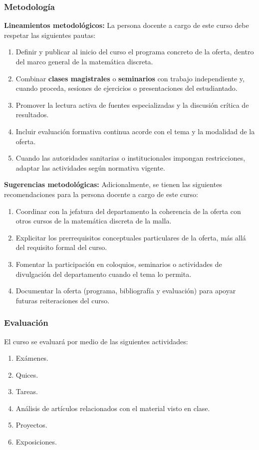 \begin{refsection}
\subsubsection*{Metodología}

\noindent \textbf{Lineamientos metodológicos:} La persona docente a cargo de este curso debe respetar las siguientes pautas:

\begin{enumerate}
    \item Definir y publicar al inicio del curso el programa concreto de la oferta, dentro del marco general de la matemática discreta.
    \item Combinar \textbf{clases magistrales} o \textbf{seminarios} con trabajo independiente y, cuando proceda, sesiones de ejercicios o presentaciones del estudiantado.
    \item Promover la lectura activa de fuentes especializadas y la discusión crítica de resultados.
    \item Incluir evaluación formativa continua acorde con el tema y la modalidad de la oferta.
    \item Cuando las autoridades sanitarias o institucionales impongan restricciones, adaptar las actividades según normativa vigente.
\end{enumerate}

\textbf{Sugerencias metodológicas:} Adicionalmente, se tienen las siguientes recomendaciones para la persona docente a cargo de este curso:

\begin{enumerate}
    \item Coordinar con la jefatura del departamento la coherencia de la oferta con otros cursos de la matemática discreta de la malla.
    \item Explicitar los prerrequisitos conceptuales particulares de la oferta, más allá del requisito formal del curso.
    \item Fomentar la participación en coloquios, seminarios o actividades de divulgación del departamento cuando el tema lo permita.
    \item Documentar la oferta (programa, bibliografía y evaluación) para apoyar futuras reiteraciones del curso.
\end{enumerate}

\subsubsection*{Evaluación}

El curso se evaluará por medio de las siguientes actividades:

\begin{enumerate}
\item Exámenes.
\item Quices.
\item Tareas.
\item Análisis de artículos relacionados con el material visto en clase.
\item Proyectos.
\item Exposiciones.
\end{enumerate}

\end{refsection}
